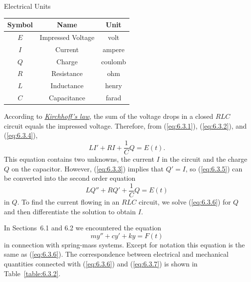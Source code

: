 \medskip
\begin{newtable}
  \label{table:6.3.1} Electrical Units
  \begin{center}
    \begin{tabular}{|c|c|c|}
      \hline
      {\bf Symbol} & {\bf Name}        & {\bf Unit} \\
      \hline
      $E$          & Impressed Voltage & volt       \\
      \hline
      $I$          & Current           & ampere     \\
      \hline
      $Q$          & Charge            & coulomb    \\
      \hline
      $R$          & Resistance        & ohm        \\
      \hline
      $L$          & Inductance        & henry      \\
      \hline
      $C$          & Capacitance       & farad      \\
      \hline
    \end{tabular}
  \end{center}
\end{newtable}

According to \href{https://mathshistory.st-andrews.ac.uk/Biographies/Kirchhoff/}{\color{blue}
\it Kirchhoff's law\/}, the sum of the voltage drops in a closed $RLC$ circuit equals the impressed
voltage. Therefore, from (\ref{eq:6.3.1}), (\ref{eq:6.3.2}), and (\ref{eq:6.3.4}),
\begin{equation}
  \label{eq:6.3.5}LI'+RI+\frac{1}{C}Q=E(t).
\end{equation}
This equation contains two unknowns, the current $I$ in the circuit and the charge $Q$ on the
capacitor. However, (\ref{eq:6.3.3}) implies that $Q'=I$, so (\ref{eq:6.3.5}) can be converted into
the second order equation
\begin{equation}
  \label{eq:6.3.6}LQ''+RQ'+\frac{1}{C}Q=E(t)
\end{equation}
in $Q$. To find the current flowing in an $RLC$ circuit, we solve (\ref{eq:6.3.6}) for $Q$ and then
differentiate the solution to obtain $I$.

In Sections~6.1 and 6.2 we encountered the equation
\begin{equation}
  \label{eq:6.3.7}my''+cy'+ky=F(t)
\end{equation}
in connection with spring-mass systems. Except for notation this equation is the same as
(\ref{eq:6.3.6}). The correspondence between electrical and mechanical quantities connected with
(\ref{eq:6.3.6}) and (\ref{eq:6.3.7}) is shown in Table~\ref{table:6.3.2}.

